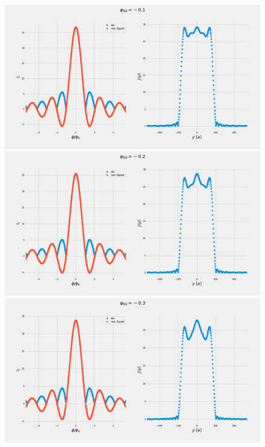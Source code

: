 \documentclass[a4paper]{article}
\begin{document}
\begin{figure}
\includegraphics[width=\textwidth]{figs/wg32double/current_and_density_01}
\includegraphics[width=\textwidth]{figs/wg32double/current_and_density_02}
\includegraphics[width=\textwidth]{figs/wg32double/current_and_density_03}
\end{figure}
\end{document}

